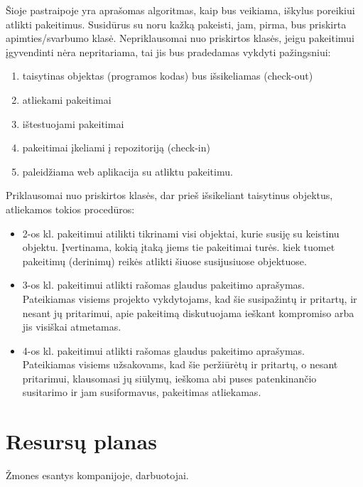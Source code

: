 \documentclass[a4paper,12pt]{article}
\begin{document}
Šioje pastraipoje yra aprašomas algoritmas, kaip bus veikiama, iškylus poreikiui atlikti pakeitimus. 
Susidūrus su noru kažką pakeisti, jam, pirma, bus priskirta apimties/svarbumo klasė. Nepriklausomai nuo priskirtos klasės, jeigu pakeitimui įgyvendinti nėra nepritariama, tai jis bus pradedamas vykdyti pažingsniui: 
\begin{enumerate}
	\item taisytinas objektas (programos kodas) bus išsikeliamas
 (check-out)
 	\item atliekami pakeitimai
 	\item ištestuojami pakeitimai
 	\item pakeitimai įkeliami į repozitoriją (check-in)
 	\item paleidžiama web aplikacija su atliktu pakeitimu.
\end{enumerate}
Priklausomai nuo priskirtos klasės, dar prieš išsikeliant taisytinus objektus, atliekamos tokios procedūros: 
\begin{itemize}
	\item 2-os kl. pakeitimui atilikti tikrinami visi objektai, kurie susiję su keistinu objektu.
		Įvertinama, kokią įtaką jiems tie pakeitimai turės. kiek tuomet pakeitimų (derinimų) reikės atlikti šiuose susijusiuose objektuose.		
	\item 3-os kl. pakeitimui atlikti rašomas glaudus pakeitimo aprašymas.\\
	Pateikiamas visiems projekto vykdytojams, kad šie susipažintų ir pritartų, ir nesant jų pritarimui, apie pakeitimą diskutuojama ieškant kompromiso arba jis visiškai atmetamas.
	\item 4-os kl. pakeitimui atlikti rašomas glaudus pakeitimo aprašymas.\\
	Pateikiamas visiems užsakovams, kad šie peržiūrėtų ir pritartų, o nesant pritarimui, klausomasi jų siūlymų, ieškoma abi puses patenkinančio susitarimo ir jam susiformavus, pakeitimas atliekamas. 
\end{itemize}
 
\section{Resursų planas}



Žmones esantys kompanijoje, darbuotojai.
\end{document}
